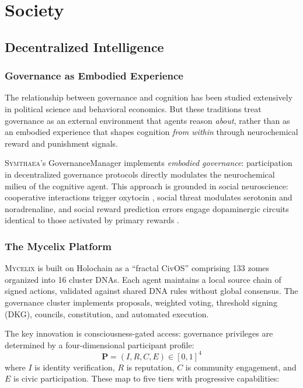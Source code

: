 \documentclass[12pt]{book}
\newcommand{\symthaea}{\textsc{Symthaea}}
\newcommand{\mycelix}{\textsc{Mycelix}}
\begin{document}
\part{Society}

\chapter{Decentralized Intelligence}
\label{ch:governance}

\section{Governance as Embodied Experience}

The relationship between governance and cognition has been studied extensively in political science and behavioral economics. But these traditions treat governance as an external environment that agents reason \textit{about}, rather than as an embodied experience that shapes cognition \textit{from within} through neurochemical reward and punishment signals.

\symthaea{}'s GovernanceManager implements \textit{embodied governance}: participation in decentralized governance protocols directly modulates the neurochemical milieu of the cognitive agent. This approach is grounded in social neuroscience: cooperative interactions trigger oxytocin \citep{kosfeld2005oxytocin}, social threat modulates serotonin and noradrenaline, and social reward prediction errors engage dopaminergic circuits identical to those activated by primary rewards \citep{schultz1997neural}.

\section{The Mycelix Platform}

\mycelix{} is built on Holochain as a ``fractal CivOS'' comprising 133 zomes organized into 16 cluster DNAs. Each agent maintains a local source chain of signed actions, validated against shared DNA rules without global consensus. The governance cluster implements proposals, weighted voting, threshold signing (DKG), councils, constitution, and automated execution.

The key innovation is consciousness-gated access: governance privileges are determined by a four-dimensional participant profile:
\begin{equation}
\mathbf{P} = (I, R, C, E) \in [0, 1]^4
\end{equation}
where $I$ is identity verification, $R$ is reputation, $C$ is community engagement, and $E$ is civic participation. These map to five tiers with progressive capabilities:
\end{document}
